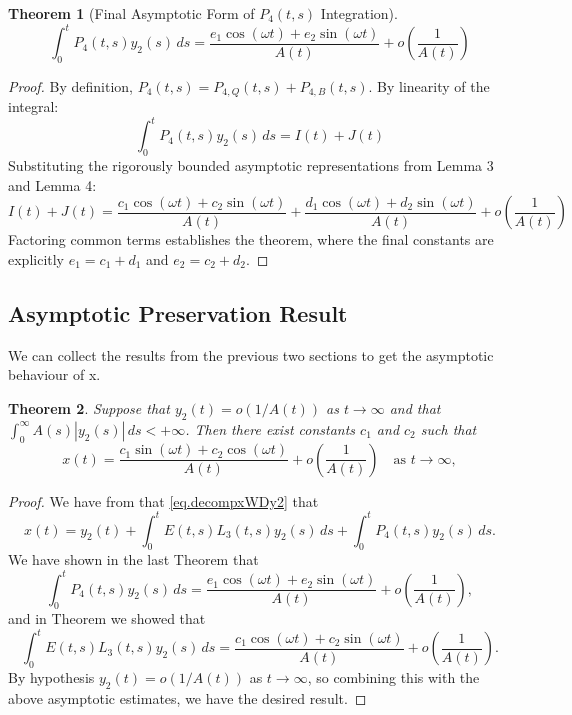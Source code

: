 \documentclass[10pt,reqno]{amsart}
\newtheorem{theorem}{Theorem}
\theoremstyle{definition}
\begin{document}
	\vspace{0.5cm}
	
	\begin{theorem}[Final Asymptotic Form of $P_4(t,s)$ Integration]
		\[ \int_0^t P_4(t,s)y_2(s)\,ds = \frac{e_1 \cos(\omega t) + e_2 \sin(\omega t)}{A(t)} + o\left(\frac{1}{A(t)}\right) \]
	\end{theorem}
	
	\begin{proof}
		By definition, $P_4(t,s) = P_{4,Q}(t,s) + P_{4,B}(t,s)$. By linearity of the integral:
		\[ \int_0^t P_4(t,s)y_2(s)\,ds = I(t) + J(t) \]
		Substituting the rigorously bounded asymptotic representations from Lemma 3 and Lemma 4:
		\[ I(t) + J(t) = \frac{c_1 \cos(\omega t) + c_2 \sin(\omega t)}{A(t)} + \frac{d_1 \cos(\omega t) + d_2 \sin(\omega t)}{A(t)} + o\left(\frac{1}{A(t)}\right) \]
		Factoring common terms establishes the theorem, where the final constants are explicitly $e_1 = c_1 + d_1$ and $e_2 = c_2 + d_2$.
	\end{proof}
	
\subsection{Asymptotic Preservation Result}
We can collect the results from the previous two sections to get the asymptotic behaviour of x.
\begin{theorem}
Suppose that $y_2(t)=o(1/A(t))$ as $t\to\infty$ and that $\int_0^\infty A(s)|y_2(s)|\,ds <+\infty$. Then there exist constants $c_1$ and $c_2$ such that 	
			\begin{equation} \label{eq:x_asymp_form}
		x(t) = \frac{c_1 \sin(\omega t) + c_2 \cos(\omega t)}{A(t)} + o\left(\frac{1}{A(t)}\right) \quad \text{as } t \to \infty,
	\end{equation}
\end{theorem}
\begin{proof}
We have from that \eqref{eq.decompxWDy2} that	\[
	x(t) = y_2(t)+\int_0^t E(t, s) L_3(t, s) y_2(s)\,ds + \int_0^t P_4(t,s)y_2(s)\,ds.
\]
We have shown in the last Theorem that
		\[ \int_0^t P_4(t,s)y_2(s)\,ds = \frac{e_1 \cos(\omega t) + e_2 \sin(\omega t)}{A(t)} + o\left(\frac{1}{A(t)}\right), \]
		and in Theorem we showed that  
		\[ 	\int_0^t E(t, s) L_3(t, s) y_2(s)\,ds=
		\frac{c_1 \cos(\omega t) + c_2 \sin(\omega t)}{A(t)} + o\left(\frac{1}{A(t)}\right).
		\]
		By hypothesis $y_2(t)=o(1/A(t))$ as $t\to\infty$, so combining this with the above asymptotic estimates, we have the desired result. 
\end{proof}
	
\end{document}
